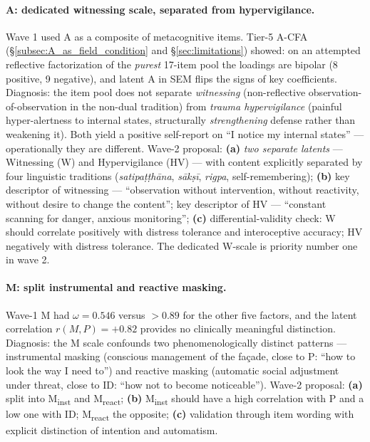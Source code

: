 \paragraph{A: dedicated witnessing scale, separated from hypervigilance.} Wave 1 used A as a composite of metacognitive items. Tier-5 A-CFA (§\ref{subsec:A_as_field_condition} and §\ref{sec:limitations}) showed: on an attempted reflective factorization of the \emph{purest} 17-item pool the loadings are bipolar (8 positive, 9 negative), and latent A in SEM flips the signs of key coefficients. Diagnosis: the item pool does not separate \emph{witnessing} (non-reflective observation-of-observation in the non-dual tradition) from \emph{trauma hypervigilance} (painful hyper-alertness to internal states, structurally \emph{strengthening} defense rather than weakening it). Both yield a positive self-report on ``I notice my internal states'' --- operationally they are different. Wave-2 proposal: \textbf{(a)} \emph{two separate latents} --- Witnessing (W) and Hypervigilance (HV) --- with content explicitly separated by four linguistic traditions (\emph{satipaṭṭhāna}, \emph{sākṣī}, \emph{rigpa}, self-remembering); \textbf{(b)} key descriptor of witnessing --- ``observation without intervention, without reactivity, without desire to change the content''; key descriptor of HV --- ``constant scanning for danger, anxious monitoring''; \textbf{(c)} differential-validity check: W should correlate positively with distress tolerance and interoceptive accuracy; HV negatively with distress tolerance. The dedicated W-scale is priority number one in wave 2.

\paragraph{M: split instrumental and reactive masking.} Wave-1 M had $\omega = 0.546$ versus $> 0.89$ for the other five factors, and the latent correlation $r(M, P) = +0.82$ provides no clinically meaningful distinction. Diagnosis: the M scale confounds two phenomenologically distinct patterns --- instrumental masking (conscious management of the façade, close to P: ``how to look the way I need to'') and reactive masking (automatic social adjustment under threat, close to ID: ``how not to become noticeable''). Wave-2 proposal: \textbf{(a)} split into M\textsubscript{inst} and M\textsubscript{react}; \textbf{(b)} M\textsubscript{inst} should have a high correlation with P and a low one with ID; M\textsubscript{react} the opposite; \textbf{(c)} validation through item wording with explicit distinction of intention and automatism.

